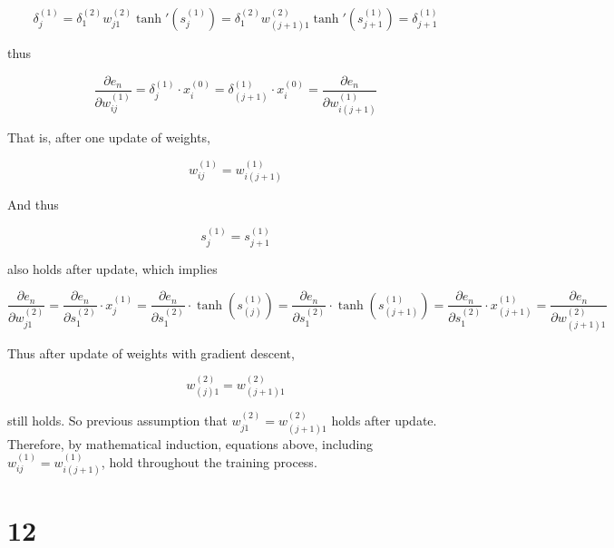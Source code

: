 \documentclass[fleqn,a4paper,12pt]{article}
\begin{document}
\begin{equation*}
  \delta_j^{(1)}
  = \delta_1^{(2)} w_{j1}^{(2)} \tanh'(s_j^{(1)})
  = \delta_1^{(2)} w_{(j + 1)1}^{(2)} \tanh'(s_{j + 1}^{(1)})
  = \delta_{j + 1}^{(1)} 
\end{equation*}

thus

\begin{equation*}
  \frac{\partial e_n}{\partial w_{ij}^{(1)}}
  = \delta_j^{(1)} \cdot x_i^{(0)} 
  = \delta_{(j + 1)}^{(1)} \cdot x_i^{(0)} 
  = \frac{\partial e_n}{\partial w_{i(j + 1)}^{(1)}}
\end{equation*}

That is, after one update of weights,

\begin{equation*}
  w_{ij}^{(1)} = w_{i(j + 1)}^{(1)}
\end{equation*}


And thus

\begin{equation*}
s^{(1)}_j = s^{(1)}_{j + 1}
\end{equation*}

also holds after update, which implies

\begin{equation*}
  \frac{\partial e_n}{\partial w_{j1}^{(2)}}
  = \frac{\partial e_n}{\partial s_1^{(2)}} \cdot x_j^{(1)}
  = \frac{\partial e_n}{\partial s_1^{(2)}} \cdot \tanh(s^{(1)}_{(j)})
  = \frac{\partial e_n}{\partial s_1^{(2)}} \cdot \tanh(s^{(1)}_{(j+1)})
  = \frac{\partial e_n}{\partial s_1^{(2)}} \cdot x_{(j+1)}^{(1)}
  = \frac{\partial e_n}{\partial w_{(j + 1)1}^{(2)}}
\end{equation*}

Thus after update of weights with gradient descent,

\begin{equation*}
  w_{(j)1}^{(2)} = w_{(j + 1)1}^{(2)}
\end{equation*}

still holds. So previous assumption that $w_{j1}^{(2)} = w_{(j + 1)1}^{(2)}$ holds after update. Therefore, by mathematical induction, equations above, including $w_{ij}^{(1)} = w_{i(j + 1)}^{(1)}$, hold throughout the training process.

\section*{12}
\end{document}
